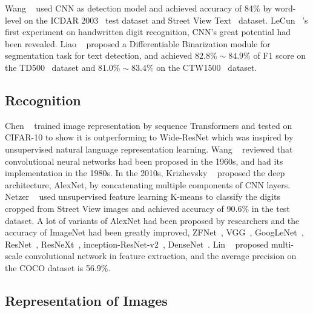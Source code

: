 \documentclass[review]{cvpr}
\begin{document}
  Wang \etal~\cite{wang2012end} used CNN as detection model and achieved accuracy of 84\% by word-level on the ICDAR 2003~\cite{lucas2003icdar} test dataset and Street View Text~\cite{wang2011end} dataset.
  LeCun \etal~\cite{lecun1990handwritten}'s first experiment on handwritten digit recognition, CNN's great potential had been revealed.
  Liao \etal~\cite{liao2020real} proposed a Differentiable Binarization module for segmentation task for text detection, and achieved $82.8\%\sim84.9\%$ of F1 score on the TD500~\cite{yao2012detecting} dataset
   and $81.0\%\sim83.4\%$ on the CTW1500~\cite{liu2019curved} dataset.

\subsection{Recognition}

  Chen \etal~\cite{chen2020generative} trained image representation by sequence Transformers and tested on CIFAR-10 to show it is outperforming to Wide-ResNet
which was inspired by unsupervised natural language representation learning.
  Wang \etal~\cite{wang2019development} reviewed that convolutional neural networks had been proposed in the 1960s, and had its implementation in the 1980s.
  In the 2010s, Krizhevsky \etal~\cite{krizhevsky2012imagenet} proposed the deep architecture, AlexNet, by concatenating multiple components of CNN layers.
  Netzer \etal~\cite{netzer2011reading} used unsupervised feature learning K-means to classify the digits cropped from Street View images and achieved accuracy of 90.6\% in the test dataset.
  A lot of variants of AlexNet had been proposed by researchers and the accuracy of ImageNet had been greatly improved, \eg ZFNet~\cite{zeiler2014visualizing}, VGG~\cite{simonyan2014very}, GoogLeNet~\cite{szegedy2015going}, ResNet~\cite{he2016deep},
  ResNeXt~\cite{xie2017aggregated}, inception-ResNet-v2~\cite{szegedy2016inception}, DenseNet~\cite{huang2016deep}.
  Lin \etal~\cite{lin2017feature} proposed multi-scale convolutional network in feature extraction, and the average precision on the COCO dataset is 56.9\%.

\subsection{Representation of Images}
\end{document}
